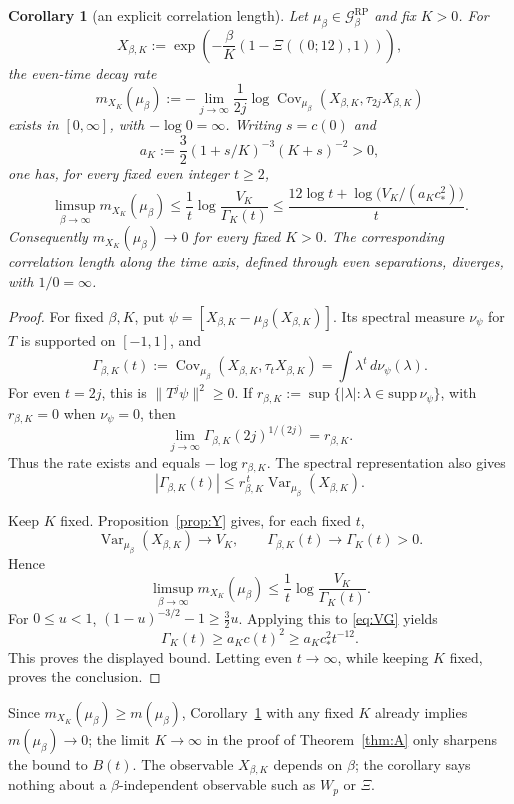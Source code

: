 \documentclass[11pt,a4paper]{article}
\theoremstyle{plain}
\newtheorem{corollary}[theorem]{Corollary}
\theoremstyle{definition}
\theoremstyle{remark}
\numberwithin{equation}{section}
\newcommand{\Var}{\operatorname{Var}}
\newcommand{\Cov}{\operatorname{Cov}}
\newcommand{\cG}{\mathcal{G}}
\begin{document}
\begin{corollary}[an explicit correlation length]\label{cor:obs}
Let $\mu_\beta\in\cG^{\mathrm{RP}}_\beta$ and fix $K>0$.
For
\[
X_{\beta,K}:=\exp\!\left(-\frac\beta K(1-\Xi((0;12),1))\right),
\]
the even-time decay rate
\[
m_{X_K}(\mu_\beta)
:=-\lim_{j\to\infty}\frac1{2j}
\log\Cov_{\mu_\beta}(X_{\beta,K},\tau_{2j}X_{\beta,K})
\]
exists in $[0,\infty]$, with $-\log0=\infty$.
Writing $s=c(0)$ and
\[
a_K:=\frac32(1+s/K)^{-3}(K+s)^{-2}>0,
\]
one has, for every fixed even integer $t\ge2$,
\[
\limsup_{\beta\to\infty}m_{X_K}(\mu_\beta)
\le\frac1t\log\frac{V_K}{\Gamma_K(t)}
\le\frac{12\log t+\log\!\bigl(V_K/(a_Kc_*^2)\bigr)}{t}.
\]
Consequently $m_{X_K}(\mu_\beta)\to0$ for every fixed $K>0$.
The corresponding correlation length along the time axis, defined through even separations, diverges,
with $1/0=\infty$.
\end{corollary}
\begin{proof}
For fixed $\beta,K$, put $\psi=[X_{\beta,K}-\mu_\beta(X_{\beta,K})]$.
Its spectral measure $\nu_\psi$ for $T$ is supported on $[-1,1]$, and
\[
\Gamma_{\beta,K}(t)
:=\Cov_{\mu_\beta}(X_{\beta,K},\tau_tX_{\beta,K})
=\int\lambda^t\,d\nu_\psi(\lambda).
\]
For even $t=2j$, this is $\|T^j\psi\|^2\ge0$.
If $r_{\beta,K}:=\sup\{|\lambda|:\lambda\in\mathrm{supp}\,\nu_\psi\}$,
with $r_{\beta,K}=0$ when $\nu_\psi=0$, then
\[
\lim_{j\to\infty}\Gamma_{\beta,K}(2j)^{1/(2j)}=r_{\beta,K}.
\]
Thus the rate exists and equals $-\log r_{\beta,K}$.
The spectral representation also gives
\[
|\Gamma_{\beta,K}(t)|
\le r_{\beta,K}^{\,t}\Var_{\mu_\beta}(X_{\beta,K}).
\]

Keep $K$ fixed. Proposition~\ref{prop:Y} gives, for each fixed $t$,
\[
\Var_{\mu_\beta}(X_{\beta,K})\to V_K,
\qquad
\Gamma_{\beta,K}(t)\to\Gamma_K(t)>0.
\]
Hence
\[
\limsup_{\beta\to\infty}m_{X_K}(\mu_\beta)
\le\frac1t\log\frac{V_K}{\Gamma_K(t)}.
\]
For $0\le u<1$, $(1-u)^{-3/2}-1\ge\frac32u$.
Applying this to \eqref{eq:VG} yields
\[
\Gamma_K(t)\ge a_Kc(t)^2\ge a_Kc_*^2t^{-12}.
\]
This proves the displayed bound. Letting even $t\to\infty$, while keeping $K$ fixed, proves the conclusion.
\end{proof}
Since $m_{X_K}(\mu_\beta)\ge m(\mu_\beta)$, Corollary~\ref{cor:obs} with any fixed $K$ already implies $m(\mu_\beta)\to0$; the limit
$K\to\infty$ in the proof of Theorem~\ref{thm:A} only sharpens the bound to $B(t)$. The observable $X_{\beta,K}$ depends on $\beta$; the
corollary says nothing about a $\beta$-independent observable such as $W_p$ or $\Xi$.
\end{document}
